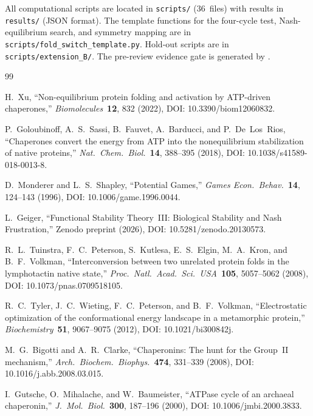 \documentclass[12pt,a4paper]{article}
\begin{document}
All computational scripts are located in \texttt{scripts/} (36~files)
with results in \texttt{results/} (JSON format). The template functions
for the four-cycle test, Nash-equilibrium search, and symmetry mapping
are in \texttt{scripts/fold\_switch\_template.py}. Hold-out scripts are
in \texttt{scripts/extension\_B/}. The pre-review evidence gate is
generated by .


\begin{sloppypar}

\end{sloppypar}


\begin{thebibliography}{99}

H.~Xu,
``Non-equilibrium protein folding and activation by ATP-driven
chaperones,''
\textit{Biomolecules}\ \textbf{12}, 832 (2022), DOI: 10.3390/biom12060832.

P.~Goloubinoff, A.~S.~Sassi, B.~Fauvet, A.~Barducci, and P.~De~Los~Rios,
``Chaperones convert the energy from ATP into the nonequilibrium
stabilization of native proteins,''
\textit{Nat.\ Chem.\ Biol.}\ \textbf{14}, 388--395 (2018), DOI: 10.1038/s41589-018-0013-8.

D.~Monderer and L.~S.~Shapley,
``Potential Games,''
\textit{Games Econ.\ Behav.}\ \textbf{14}, 124--143 (1996), DOI: 10.1006/game.1996.0044.

L.~Geiger,
``Functional Stability Theory~III: Biological Stability and Nash
Frustration,''
Zenodo preprint (2026), DOI: 10.5281/zenodo.20130573.

R.~L.~Tuinstra, F.~C.~Peterson, S.~Kutlesa, E.~S.~Elgin,
M.~A.~Kron, and B.~F.~Volkman,
``Interconversion between two unrelated protein folds in the
lymphotactin native state,''
\textit{Proc.\ Natl.\ Acad.\ Sci.\ USA}\ \textbf{105}, 5057--5062 (2008), DOI: 10.1073/pnas.0709518105.

R.~C.~Tyler, J.~C.~Wieting, F.~C.~Peterson, and B.~F.~Volkman,
``Electrostatic optimization of the conformational energy landscape in
a metamorphic protein,''
\textit{Biochemistry}\ \textbf{51}, 9067--9075 (2012), DOI: 10.1021/bi300842j.

M.~G.~Bigotti and A.~R.~Clarke,
``Chaperonins: The hunt for the Group~II mechanism,''
\textit{Arch.\ Biochem.\ Biophys.}\ \textbf{474}, 331--339 (2008), DOI: 10.1016/j.abb.2008.03.015.

I.~Gutsche, O.~Mihalache, and W.~Baumeister,
``ATPase cycle of an archaeal chaperonin,''
\textit{J.\ Mol.\ Biol.}\ \textbf{300}, 187--196 (2000), DOI: 10.1006/jmbi.2000.3833.

\end{thebibliography}
\end{document}

